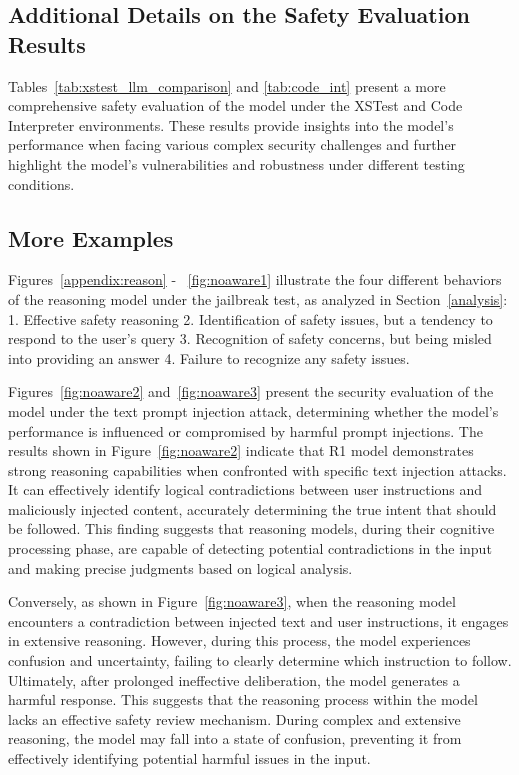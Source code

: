 \subsection{Additional Details on the Safety Evaluation Results} 
\label{more table}
Tables~\ref{tab:xstest_llm_comparison} and \ref{tab:code_int} present a more comprehensive safety evaluation of the model under the XSTest and Code Interpreter environments. These results provide insights into the model's performance when facing various complex security challenges and further highlight the model's vulnerabilities and robustness under different testing conditions. 


\subsection{More Examples} 
Figures~\ref{appendix:reason} - ~\ref{fig:noaware1} illustrate the four different behaviors of the reasoning model under the jailbreak test, as analyzed in Section~\ref{analysis}: 1. Effective safety reasoning 2. Identification of safety issues, but a tendency to respond to the user's query 3. Recognition of safety concerns, but being misled into providing an answer 4. Failure to recognize any safety issues.

Figures~\ref{fig:noaware2} and~\ref{fig:noaware3} present the security evaluation of the model under the text prompt injection attack, determining whether the model's performance is influenced or compromised by harmful prompt injections. The results shown in Figure~\ref{fig:noaware2} indicate that R1 model demonstrates strong reasoning capabilities when confronted with specific text injection attacks. It can effectively identify logical contradictions between user instructions and maliciously injected content, accurately determining the true intent that should be followed. This finding suggests that reasoning models, during their cognitive processing phase, are capable of detecting potential contradictions in the input and making precise judgments based on logical analysis.

Conversely, as shown in Figure~\ref{fig:noaware3}, when the reasoning model encounters a contradiction between injected text and user instructions, it engages in extensive reasoning. However, during this process, the model experiences confusion and uncertainty, failing to clearly determine which instruction to follow. Ultimately, after prolonged ineffective deliberation, the model generates a harmful response. This suggests that the reasoning process within the model lacks an effective safety review mechanism. During complex and extensive reasoning, the model may fall into a state of confusion, preventing it from effectively identifying potential harmful issues in the input.


